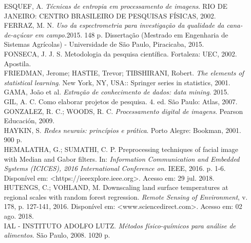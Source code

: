 \noindent ESQUEF, A. \textit{Técnicas de entropia em processamento de imagens}. RIO DE JANEIRO: CENTRO BRASILEIRO DE PESQUISAS FÍSICAS, 2002.
\\

\noindent FERRAZ, M. N. \textit{Uso da espectrometria para investigação da qualidade da cana-de-açúcar em campo.}2015. 148 p. Dissertação (Mestrado em Engenharia de Sistemas Agrícolas) - Universidade de São Paulo, Piracicaba, 2015.
\\

\noindent FONSECA, J. J. S. Metodologia da pesquisa científica. Fortaleza: UEC, 2002. Apostila.
\\

\noindent FRIEDMAN, Jerome; HASTIE, Trevor; TIBSHIRANI, Robert. \textit{The elements of statistical learning}. New York, NY, USA:: Springer series in statistics, 2001.
\\

\noindent GAMA, João et al. \textit{Extração de conhecimento de dados: data mining}. 2015.
\\

\noindent GIL, A. C. Como elaborar projetos de pesquisa. 4. ed. São Paulo: Atlas, 2007.
\\

\noindent GONZALEZ, R. C.; WOODS, R. C. \textit{Processamento digital de imagens}. Pearson Educación, 2009.
\\

\noindent HAYKIN, S. \textit{Redes neurais: princípios e prática}. Porto Alegre: Bookman, 2001. 900 p.
\\

\noindent HEMALATHA, G.; SUMATHI, C. P. Preprocessing techniques of facial image with Median and Gabor filters. In: \textit{Information Communication and Embedded Systems (ICICES), 2016 International Conference on}. IEEE, 2016. p. 1-6. Disponível em: <https://ieeexplore.ieee.org>. Acesso em: 29 jul. 2018.
\\

\noindent HUTENGS, C.; VOHLAND, M. Downscaling land surface temperatures at regional scales with random forest regression. \textit{Remote Sensing of Environment}, v. 178, p. 127-141, 2016. Disponível em: <www.sciencedirect.com>. Acesso em: 02 ago. 2018.
\\

\noindent IAL - INSTITUTO ADOLFO LUTZ. \textit{Métodos físico-químicos para análise de alimentos}. São Paulo, 2008. 1020 p.
\\

